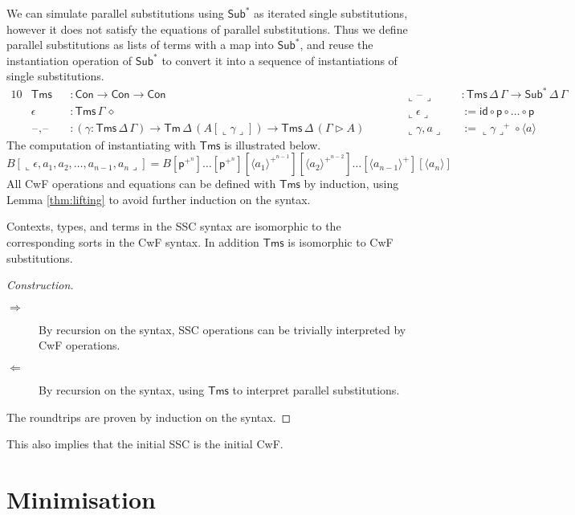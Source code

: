 \documentclass[a4paper,UKenglish,cleveref, autoref, thm-restate]{lipics-v2021}
\newcommand{\ra}{\rightarrow}
\newcommand{\Tm}{\mathsf{Tm}}
\newcommand{\Con}{\mathsf{Con}}
\newcommand{\Sub}{\mathsf{Sub}}
\newcommand{\Tms}{\mathsf{Tms}}
\newcommand{\p}{\mathsf{p}}
\newcommand{\ext}{\mathop{\triangleright}}
\newcommand{\blank}{\mathord{\hspace{1pt}\text{--}\hspace{1pt}}} %
\newcommand{\id}{\mathsf{id}}
\begin{document}
We can simulate parallel substitutions using $\Sub^*$ as iterated single
substitutions, however it does not satisfy the equations of parallel
substitutions. Thus we define parallel substitutions as lists of terms with a
map into $\Sub^*$, and reuse the instantiation operation of $\Sub^*$ to convert it
into a sequence of instantiations of single substitutions.
\begin{alignat*}{10}
  & \Tms && : \Con\ra\Con\ra\Con && \llcorner\blank\lrcorner && : \Tms\,\Delta\,\Gamma \to \Sub^*\,\Delta\,\Gamma \\
  & \epsilon && : \Tms\,\Gamma\,\diamond && \llcorner\epsilon\lrcorner && := \id\circ\p\circ\dots\circ\p \\
  & \blank,\blank && : (\gamma:\Tms\,\Delta\,\Gamma)\ra\Tm\,\Delta\,(A[\llcorner\gamma\lrcorner])\ra\Tms\,\Delta\,(\Gamma\ext A)\hspace{2em} && \llcorner\gamma,a\lrcorner && := \llcorner\gamma\lrcorner^+\circ\langle a \rangle
\end{alignat*}
The computation of instantiating with $\Tms$ is illustrated below.
\[
  B[\llcorner\epsilon,a_1,a_2,\dots,a_{n-1},a_n\lrcorner] = 
  B[\p^{+^n}]\dots[\p^{+^n}][\langle a_1 \rangle^{+^{n-1}}][\langle a_2 \rangle^{+^{n-2}}]\dots[\langle a_{n-1} \rangle^+][\langle a_n \rangle]
\]
All CwF operations and equations can be defined with $\Tms$ by induction, using
Lemma \ref{thm:lifting} to avoid further induction on the syntax.

\begin{problem}
  Contexts, types, and terms in the SSC syntax are isomorphic to the
  corresponding sorts in the CwF syntax. In addition $\Tms$ is isomorphic to CwF
  substitutions.
\end{problem}
\begin{proof}[Construction]\leavevmode
  \begin{description}
    \item[$\Rightarrow$] By recursion on the syntax, SSC operations can be
    trivially interpreted by CwF operations.
    \item[$\Leftarrow$] By recursion on the syntax, using $\Tms$ to interpret
    parallel substitutions.
  \end{description}
  The roundtrips are proven by induction on the syntax.
\end{proof}
This also implies that the initial SSC is the initial CwF.

\section{Minimisation}
\label{sec:minimisation}
\end{document}
